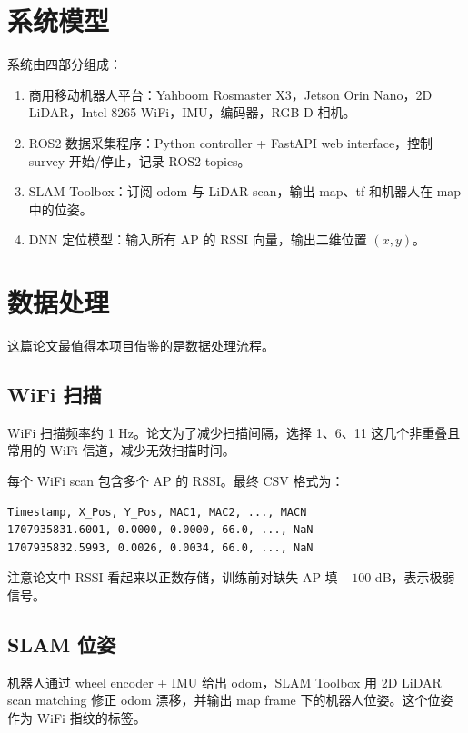 \documentclass[UTF8,a4paper,12pt]{ctexrep}
\begin{document}
\section{系统模型}

系统由四部分组成：

\begin{enumerate}
  \item 商用移动机器人平台：Yahboom Rosmaster X3，Jetson Orin Nano，2D LiDAR，Intel 8265 WiFi，IMU，编码器，RGB-D 相机。
  \item ROS2 数据采集程序：Python controller + FastAPI web interface，控制 survey 开始/停止，记录 ROS2 topics。
  \item SLAM Toolbox：订阅 odom 与 LiDAR scan，输出 map、tf 和机器人在 map 中的位姿。
  \item DNN 定位模型：输入所有 AP 的 RSSI 向量，输出二维位置 \((x,y)\)。
\end{enumerate}

\section{数据处理}

这篇论文最值得本项目借鉴的是数据处理流程。

\subsection{WiFi 扫描}

WiFi 扫描频率约 1 Hz。论文为了减少扫描间隔，选择 1、6、11 这几个非重叠且常用的 WiFi 信道，减少无效扫描时间。

每个 WiFi scan 包含多个 AP 的 RSSI。最终 CSV 格式为：

\begin{lstlisting}
Timestamp, X_Pos, Y_Pos, MAC1, MAC2, ..., MACN
1707935831.6001, 0.0000, 0.0000, 66.0, ..., NaN
1707935832.5993, 0.0026, 0.0034, 66.0, ..., NaN
\end{lstlisting}

注意论文中 RSSI 看起来以正数存储，训练前对缺失 AP 填 \(-100\) dB，表示极弱信号。

\subsection{SLAM 位姿}

机器人通过 wheel encoder + IMU 给出 odom，SLAM Toolbox 用 2D LiDAR scan matching 修正 odom 漂移，并输出 map frame 下的机器人位姿。这个位姿作为 WiFi 指纹的标签。
\end{document}
